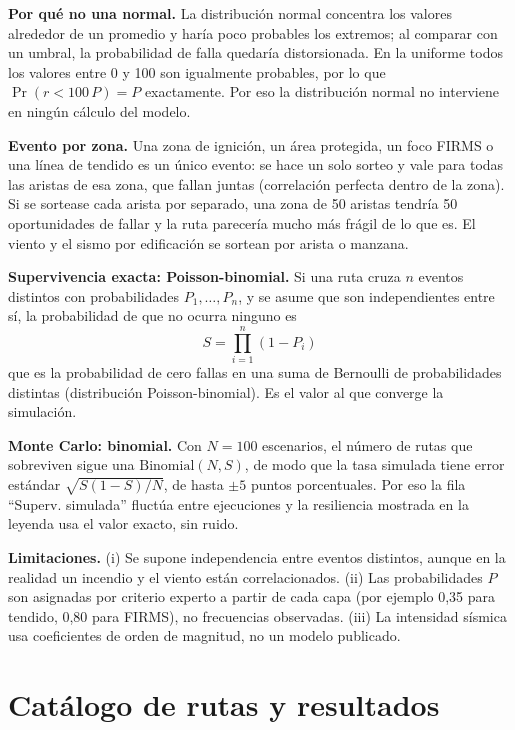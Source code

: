 \documentclass[conference]{IEEEtran}
\begin{document}
\textbf{Por qué no una normal.} La distribución normal concentra los valores alrededor de un promedio y haría poco probables los extremos; al comparar con un umbral, la probabilidad de falla quedaría distorsionada. En la uniforme todos los valores entre 0 y 100 son igualmente probables, por lo que $\Pr(r < 100\,P) = P$ exactamente. Por eso la distribución normal no interviene en ningún cálculo del modelo.

\textbf{Evento por zona.} Una zona de ignición, un área protegida, un foco FIRMS o una línea de tendido es un único evento: se hace un solo sorteo y vale para todas las aristas de esa zona, que fallan juntas (correlación perfecta dentro de la zona). Si se sortease cada arista por separado, una zona de 50 aristas tendría 50 oportunidades de fallar y la ruta parecería mucho más frágil de lo que es. El viento y el sismo por edificación se sortean por arista o manzana.

\textbf{Supervivencia exacta: Poisson-binomial.} Si una ruta cruza $n$ eventos distintos con probabilidades $P_1,\dots,P_n$, y se asume que son independientes entre sí, la probabilidad de que no ocurra ninguno es
\begin{equation}
S = \prod_{i=1}^{n} (1 - P_i)
\end{equation}
que es la probabilidad de cero fallas en una suma de Bernoulli de probabilidades distintas (distribución Poisson-binomial). Es el valor al que converge la simulación.

\textbf{Monte Carlo: binomial.} Con $N=100$ escenarios, el número de rutas que sobreviven sigue una $\text{Binomial}(N, S)$, de modo que la tasa simulada tiene error estándar $\sqrt{S(1-S)/N}$, de hasta $\pm 5$ puntos porcentuales. Por eso la fila ``Superv. simulada'' fluctúa entre ejecuciones y la resiliencia mostrada en la leyenda usa el valor exacto, sin ruido.

\textbf{Limitaciones.} (i) Se supone independencia entre eventos distintos, aunque en la realidad un incendio y el viento están correlacionados. (ii) Las probabilidades $P$ son asignadas por criterio experto a partir de cada capa (por ejemplo 0,35 para tendido, 0,80 para FIRMS), no frecuencias observadas. (iii) La intensidad sísmica usa coeficientes de orden de magnitud, no un modelo publicado.

\section{Catálogo de rutas y resultados}
\label{sec:resultados}
\end{document}
